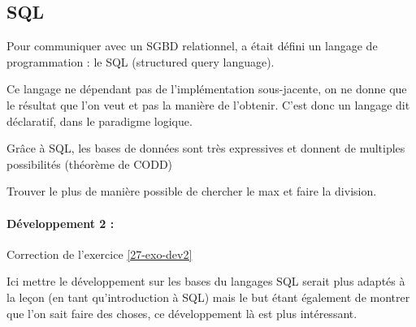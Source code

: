 \subsection{SQL}

Pour communiquer avec un SGBD relationnel, a était défini un langage de programmation : le SQL (structured query language).

\begin{rem}
	Ce langage ne dépendant pas de l'implémentation sous-jacente, on ne donne que le résultat que l'on veut et pas la manière de l'obtenir. C'est donc un langage dit déclaratif, dans le paradigme logique.
\end{rem}

\begin{rem}
	Grâce à SQL, les bases de données sont très expressives et donnent de multiples possibilités (théorème de CODD)
\end{rem}

\begin{exercise}
	Trouver le plus de manière possible de chercher le max et faire la division. \label{27-exo-dev2}
\end{exercise}

\paragraph{Développement 2 :} Correction de l'exercice \ref{27-exo-dev2}

\begin{com}
	Ici mettre le développement sur les bases du langages SQL serait plus adaptés à la leçon (en tant qu'introduction à SQL) mais le but étant également de montrer que l'on sait faire des choses, ce développement là est plus intéressant.
\end{com}
